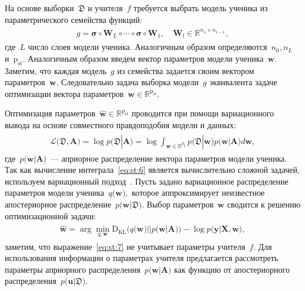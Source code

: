 \documentclass[12pt]{a&t}
\begin{document}
На основе выборки~$\mathfrak{D}$ и учителя~$f$ требуется выбрать модель ученика из параметрического семейства функций:
\begin{gather}
\label{eq:st:5}
\begin{aligned}
g = \bm{\sigma} \circ \mathbf{W}_L \circ \cdots \circ \bm{\sigma} \circ \mathbf{W}_1, \quad \mathbf{W}_l \in \mathbb{R}^{n_s \times n_{s-1}},
\end{aligned}
\end{gather}
где~$L$ число слоев модели ученика. Аналогичным образом определяются~$n_0, n_L$ и~$\text{p}_{\text{st}}$. Аналогичным образом введем вектор параметров модели ученика~$\mathbf{w}.$ Заметим, что каждая модель~$g$ из семейства задается своим вектором параметров~$\mathbf{w}$. Следовательно задача выборка модели~$g$ эквивалента задаче оптимизации вектора параметров~$\mathbf{w}\in\mathbb{R}^{\text{p}_{\text{st}}}$.

Оптимизация параметров~$\hat{\mathbf{w}} \in \mathbb{R}^{\text{p}_{\text{st}}}$ проводится при помощи вариационного вывода на основе совместного правдоподобия модели и данных:
\begin{gather}
\label{eq:st:6}
\begin{aligned}
\mathcal{L}\bigr(\mathfrak{D}, \mathbf{A}\bigr) = \log p\bigr(\mathfrak{D}|\mathbf{A}\bigr) = \log \int_{\mathbf{w} \in \mathbb{R}^{p_g}}p\bigr(\mathfrak{D}|\mathbf{w}\bigr)p\bigr(\mathbf{w}|\mathbf{A}\bigr)d\mathbf{w},
\end{aligned}
\end{gather}
где~$p\bigr(\mathbf{w}| \mathbf{A}\bigr)$~--- априорное распределение вектора параметров модели ученика.
Так как вычисление интеграла~\eqref{eq:st:6} является вычислительно сложной задачей, используем вариационный подход~\cite{graves2011, grabovoy2019}. Пусть задано вариационное распределение параметров модели ученика~$q\bigr(\mathbf{w}\bigr),$ которое аппроксимирует неизвестное апостериорное распределение~$p\bigr(\mathbf{w}|\mathfrak{D}\bigr)$. Выбор параметров~$\mathbf{w}$ сводится к решению оптимизационной задачи:
\begin{gather}
\label{eq:st:7}
\begin{aligned}
\hat{\mathbf{w}} = \arg \min_{q, \mathbf{w}} \text{D}_{\text{KL}}\bigr(q\bigr(\mathbf{w}\bigr)||p\bigr(\mathbf{w}|\mathbf{A}\bigr)\bigr) - \log p\bigr(\mathbf{y}|\mathbf{X}, \mathbf{w}\bigr),
\end{aligned}
\end{gather}
заметим, что выражение~\eqref{eq:st:7} не учитывает параметры учителя~$f$. Для использования информации о параметрах учителя предлагается рассмотреть параметры априорного распределения~$p\bigr(\mathbf{w}|\mathbf{A}\bigr)$ как функцию от апостериорного распределения~$p\bigr(\mathbf{u}|\mathfrak{D}\bigr)$.
\end{document}
